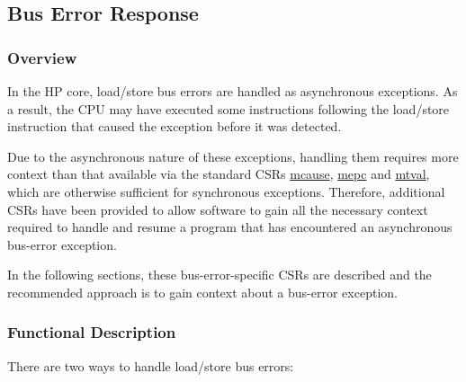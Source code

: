 \documentclass[main\_\_EN.tex]{subfiles}
\begin{document}

\subsection{Bus Error Response}
\label{sec:riscvcpu-bus-err-resp}
\subsubsection{Overview}
\label{sec:riscvcpu-buserr-overview}

In the HP core, load/store bus errors are handled as asynchronous exceptions. As a result, the CPU may have executed some instructions following the load/store instruction that caused the exception before it was detected.

Due to the asynchronous nature of these exceptions, handling them requires more context than that available via the standard CSRs \hyperref[regdesc:MCAUSE]{mcause}, \hyperref[regdesc:MEPC]{mepc} and \hyperref[regdesc:MTVAL]{mtval}, which are otherwise sufficient for synchronous exceptions. Therefore, additional CSRs have been provided to allow software to gain all the necessary context required to handle and resume a program that has encountered an asynchronous bus-error exception.

In the following sections, these bus-error-specific CSRs are described and the recommended approach is to gain context about a bus-error exception.

\subsubsection{Functional Description}
\label{sec:riscvcpu-buserr-func-descr}

There are two ways to handle load/store bus errors:
\end{document}
